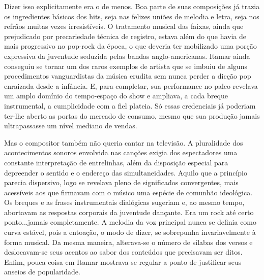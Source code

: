 Dizer isso explicitamente era o de menos. Boa parte de suas composições
já trazia os ingredientes básicos dos hits, seja nas felizes uniões de
melodia e letra, seja nos refrãos muitas vezes irresistíveis. O
tratamento musical das faixas, ainda que prejudicado por precariedade
técnica de registro, estava além do que havia de mais progressivo no
pop-rock da época, o que deveria ter mobilizado uma porção expressiva da
juventude seduzida pelas bandas anglo-americanas. Itamar ainda conseguiu
se tornar um dos raros exemplos de artista que se imbuiu de alguns
procedimentos vanguardistas da música erudita sem nunca perder a dicção
pop enraizada desde a infância. E, para completar, sua performance no
palco revelava um amplo domínio do tempo-espaço do show e ampliava, a
cada breque instrumental, a cumplicidade com a fiel plateia. Só essas
credenciais já poderiam ter-lhe aberto as portas do mercado de consumo,
mesmo que sua produção jamais ultrapassasse um nível mediano de vendas.

Mas o compositor também não queria cantar na televisão. A pluralidade
dos acontecimentos sonoros envolvida nas canções exigia dos espectadores
uma constante interpretação de entrelinhas, além da disposição especial
para depreender o sentido e o endereço das simultaneidades. Aquilo que a
princípio parecia dispersivo, logo se revelava pleno de significados
convergentes, mais acessíveis aos que firmavam com o músico uma espécie
de comunhão ideológica. Os breques e as frases instrumentais dialógicas
sugeriam e, ao mesmo tempo, abortavam as respostas corporais da
juventude dançante. Era um rock até certo ponto...jamais completamente.
A melodia da voz principal nunca se definia como curva estável, pois a
entoação, o modo de dizer, se sobrepunha invariavelmente à forma
musical. Da mesma maneira, alterava-se o número de sílabas dos versos e
deslocavam-se seus acentos ao sabor dos conteúdos que precisavam ser
ditos. Enfim, pouca coisa em Itamar mostrava-se regular a ponto de
justificar seus anseios de popularidade.

